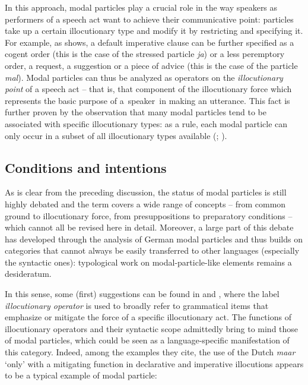 In this approach, modal particles play a crucial role in the way speakers as performers of a speech act want to achieve their communicative point: particles take up a certain illocutionary type and modify it by restricting and specifying it. For example, as \citet[262--263]{Coniglio2012} shows, a default imperative clause can be further specified as a cogent order (this is the case of the stressed particle \textit{ja}) or a less peremptory order, a request, a suggestion or a piece of advice (this is the case of the particle \textit{mal}). Modal particles can thus be analyzed as operators on the \textit{illocutionary point} of a speech act – that is, that component of the illocutionary force which represents the basic purpose of a~speaker~in making an utterance. This fact is further proven by the observation that many modal particles tend to be associated with specific illocutionary types: as a rule, each modal particle can only occur in a subset of all illocutionary types available (\citealt{Jacobs1991}; \citealt{DetgesWaltereit2009}).

\subsection{Conditions and intentions}
\hypertarget{Toc124860622}{}
As is clear from the preceding discussion, the status of modal particles is still highly debated and the term covers a wide range of concepts – from common ground to illocutionary force, from presuppositions to preparatory conditions – which cannot all be revised here in detail. Moreover, a large part of this debate has developed through the analysis of German modal particles and thus builds on categories that cannot always be easily transferred to other languages (especially the syntactic ones): typological work on modal-particle-like elements remains a desideratum.

In this sense, some (first) suggestions can be found in \citet{Hengeveld2004} and \citet{HengeveldMackenzie2008}, where the label \textit{illocutionary operator} is used to broadly refer to grammatical items that emphasize or mitigate the force of a specific illocutionary act. The functions of illocutionary operators and their syntactic scope admittedly bring to mind those of modal particles, which could be seen as a language-specific manifestation of this category. Indeed, among the examples they cite, the use of the Dutch \textit{maar} ‘only’ with a mitigating function in declarative and imperative illocutions appears to be a typical example of modal particle:

